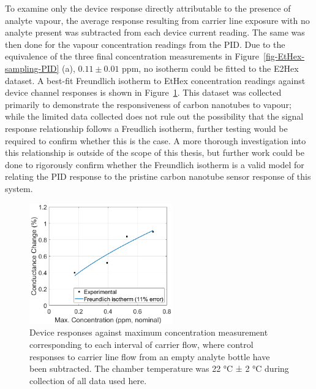 \documentclass[
  a4paper,
]{scrbook}
\begin{document}
To examine only the device response directly attributable to the
presence of analyte vapour, the average response resulting from carrier
line exposure with no analyte present was subtracted from each device
current reading. The same was then done for the vapour concentration
readings from the PID. Due to the equivalence of the three final
concentration measurements in Figure~\ref{fig-EtHex-sampling-PID} (a),
\(0.11 \pm 0.01\) ppm, no isotherm could be fitted to the E2Hex dataset.
A best-fit Freundlich isotherm to EtHex concentration readings against
device channel responses is shown in
Figure~\ref{fig-EtHex-ratio-comparison}. This dataset was collected
primarily to demonstrate the responsiveness of carbon nanotubes to
vapour; while the limited data collected does not rule out the
possibility that the signal response relationship follows a Freudlich
isotherm, further testing would be required to confirm whether this is
the case. A more thorough investigation into this relationship is
outside of the scope of this thesis, but further work could be done to
rigorously confirm whether the Freundlich isotherm is a valid model for
relating the PID response to the pristine carbon nanotube sensor
response of this system.

\begin{figure}

{\centering \includegraphics[width=0.55\textwidth,height=\textheight]{figures/ch9/EtHex-ratio-comparison.png}

}

\caption[Device responses against maximum concentration measurement
corresponding to each interval of carrier flow, where control responses
to carrier line flow from an empty analyte bottle have been
subtracted.]{\label{fig-EtHex-ratio-comparison}Device responses against
maximum concentration measurement corresponding to each interval of
carrier flow, where control responses to carrier line flow from an empty
analyte bottle have been subtracted. The chamber temperature was 22 °C ±
2 °C during collection of all data used here.}

\end{figure}
\end{document}
